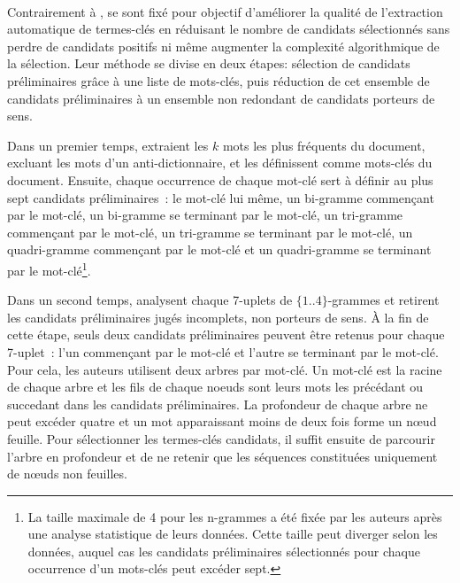     ~\\Contrairement à ,
     se sont fixé pour objectif d'améliorer
    la qualité de l'extraction automatique de termes-clés en réduisant le nombre
    de candidats sélectionnés sans perdre de candidats positifs ni même
    augmenter la complexité algorithmique de la sélection. Leur méthode se
    divise en deux étapes: sélection de candidats préliminaires grâce à une
    liste de mots-clés, puis réduction de cet ensemble de candidats
    préliminaires à un ensemble non redondant de candidats porteurs de sens.

    Dans un premier temps,  extraient les
    $k$ mots les plus fréquents du document, excluant les mots d'un
    anti-dictionnaire, et les définissent comme mots-clés du document. Ensuite,
    chaque occurrence de chaque mot-clé sert à définir au plus sept candidats
    préliminaires~: le mot-clé lui même, un bi-gramme commençant par le mot-clé,
    un bi-gramme se terminant par le mot-clé, un tri-gramme commençant par le
    mot-clé, un tri-gramme se terminant par le mot-clé, un quadri-gramme
    commençant par le mot-clé et un quadri-gramme se terminant par le
    mot-clé\footnote{La taille maximale de 4 pour les n-grammes a été fixée par
    les auteurs après une analyse statistique de leurs données. Cette taille peut
    diverger selon les données, auquel cas les candidats préliminaires
    sélectionnés pour chaque occurrence d'un mots-clés peut excéder sept.}.

    \begin{example}
    \end{example}

    Dans un second temps,  analysent chaque
    7-uplets de $\{1..4\}$-grammes et retirent les candidats préliminaires jugés
    incomplets, non porteurs de sens. À la fin de cette étape, seuls deux
    candidats préliminaires peuvent être retenus pour chaque 7-uplet~: l'un
    commençant par le mot-clé et l'autre se terminant par le mot-clé. Pour cela,
    les auteurs utilisent deux arbres par mot-clé. Un mot-clé est la racine de
    chaque arbre et les fils de chaque noeuds sont leurs mots les précédant ou
    succedant dans les candidats préliminaires. La profondeur de chaque arbre ne
    peut excéder quatre et un mot apparaissant moins de deux fois forme un
    n\oe{}ud feuille. Pour sélectionner les termes-clés candidats, il suffit
    ensuite de parcourir l'arbre en profondeur et de ne retenir que les
    séquences constituées uniquement de n\oe{}uds non feuilles.

